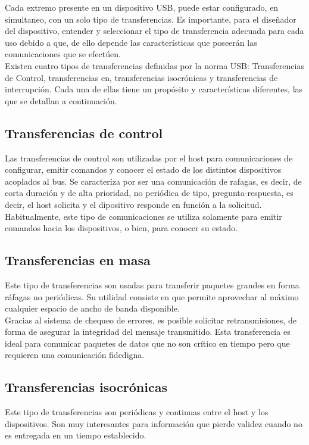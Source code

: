 Cada extremo presente en un dispositivo USB, puede estar configurado, en simultaneo, con un solo tipo de transferencias. Es importante, para el diseñador del dispositivo, entender y seleccionar el tipo de transferencia adecuada para cada uso debido a que, de ello depende las características que poseerán las comunicaciones que se efectúen.\\

Existen cuatro tipos de transferencias definidas por la norma USB: Transferencias de Control, transferencias en, transferencias isocrónicas y transferencias de interrupción. Cada una de ellas tiene un propósito y características diferentes, las que se detallan a continuación.\\

\subsection{Transferencias de control}
	Las transferencias de control son utilizadas por el host para comunicaciones de configurar, emitir comandos y conocer el estado de los distintos dispositivos acoplados al bus. Se caracteríza por ser una comunicación de rafagas, es decir, de corta duración y de alta prioridad, no periódica de tipo, pregunta-respuesta, es decir, el host solicita y el dipositivo responde en función a la solicitud.\\
	
	Habitualmente, este tipo de comunicaciones se utiliza solamente para emitir comandos hacia los dispositivos, o bien, para conocer su estado.\\
	
\subsection{Transferencias en masa}
	Este tipo de transferencias son usadas para transferir paquetes grandes en forma ráfagas no periódicas. Su utilidad consiste en que permite aprovechar al máximo cualquier espacio de ancho de banda disponible.\\
	
	Gracias al sistema de chequeo de errores, es posible solicitar retransmisiones, de forma de asegurar la integridad del mensaje transmitido. Esta transferencia es ideal para comunicar paquetes de datos que no son crítico en tiempo pero que requieren una comunicación fidedigna.\\

\subsection{Transferencias isocrónicas}
	Este tipo de transferencias son periódicas y continuas entre el host y los dispositivos. Son muy interesantes para información que pierde validez cuando no es entregada en un tiempo establecido.\\
	
